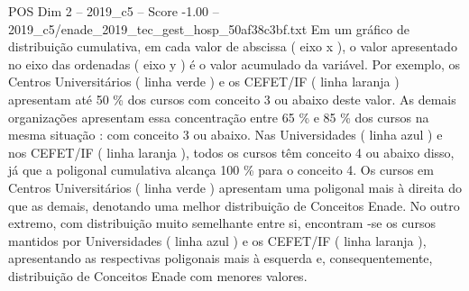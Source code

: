 \begin{textsample}{POS Dim 2 – 2019\_c5 – Score -1.00 – 2019\_c5/enade\_2019\_tec\_gest\_hosp\_50af38c3bf.txt}
Em um gráfico de distribuição cumulativa, em cada valor de abscissa ( eixo x ), o valor apresentado no eixo das ordenadas ( eixo y ) é o valor acumulado da variável.
Por exemplo, os Centros Universitários ( linha verde ) e os CEFET/IF ( linha laranja ) apresentam até 50 \% dos cursos com conceito 3 ou abaixo deste valor.
As demais organizações apresentam essa concentração entre 65 \% e 85 \% dos cursos na mesma situação : com conceito 3 ou abaixo.
Nas Universidades ( linha azul ) e nos CEFET/IF ( linha laranja ), todos os cursos têm conceito 4 ou abaixo disso, já que a poligonal cumulativa alcança 100 \% para o conceito 4.
Os cursos em Centros Universitários ( linha verde ) apresentam uma poligonal mais à direita do que as demais, denotando uma melhor distribuição de Conceitos Enade.
No outro extremo, com distribuição muito semelhante entre si, encontram -se os cursos mantidos por Universidades ( linha azul ) e os CEFET/IF ( linha laranja ), apresentando as respectivas poligonais mais à esquerda e, consequentemente, distribuição de Conceitos Enade com menores valores.

\end{textsample}
